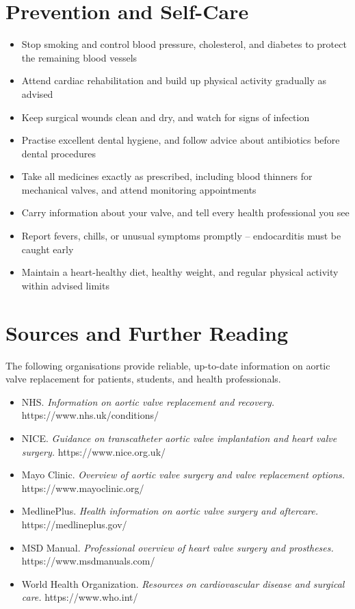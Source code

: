\section*{Prevention and Self-Care}
\begin{itemize}
    \item Stop smoking and control blood pressure, cholesterol, and diabetes to protect the remaining blood vessels
    \item Attend cardiac rehabilitation and build up physical activity gradually as advised
    \item Keep surgical wounds clean and dry, and watch for signs of infection
    \item Practise excellent dental hygiene, and follow advice about antibiotics before dental procedures
    \item Take all medicines exactly as prescribed, including blood thinners for mechanical valves, and attend monitoring appointments
    \item Carry information about your valve, and tell every health professional you see
    \item Report fevers, chills, or unusual symptoms promptly -- endocarditis must be caught early
    \item Maintain a heart-healthy diet, healthy weight, and regular physical activity within advised limits
\end{itemize}

\section*{Sources and Further Reading}
The following organisations provide reliable, up-to-date information on aortic valve replacement for patients, students, and health professionals.

\begin{itemize}
    \item NHS. \textit{Information on aortic valve replacement and recovery.} https://www.nhs.uk/conditions/
    \item NICE. \textit{Guidance on transcatheter aortic valve implantation and heart valve surgery.} https://www.nice.org.uk/
    \item Mayo Clinic. \textit{Overview of aortic valve surgery and valve replacement options.} https://www.mayoclinic.org/
    \item MedlinePlus. \textit{Health information on aortic valve surgery and aftercare.} https://medlineplus.gov/
    \item MSD Manual. \textit{Professional overview of heart valve surgery and prostheses.} https://www.msdmanuals.com/
    \item World Health Organization. \textit{Resources on cardiovascular disease and surgical care.} https://www.who.int/
\end{itemize}
